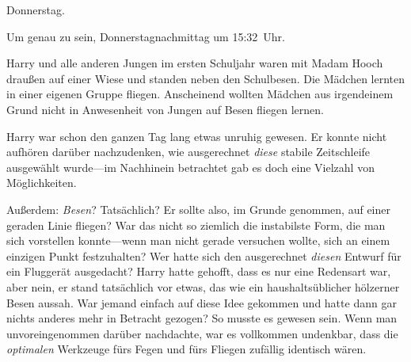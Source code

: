 \later

Donnerstag.

Um genau zu sein, Donnerstagnachmittag um 15:32~Uhr.

Harry und alle anderen Jungen im ersten Schuljahr waren mit Madam Hooch draußen auf einer Wiese und standen neben den Schulbesen. Die Mädchen lernten in einer eigenen Gruppe fliegen. Anscheinend wollten Mädchen aus irgendeinem Grund nicht in Anwesenheit von Jungen auf Besen fliegen lernen.

Harry war schon den ganzen Tag lang etwas unruhig gewesen. Er konnte nicht aufhören darüber nachzudenken, wie ausgerechnet \emph{diese} stabile Zeitschleife ausgewählt wurde—im Nachhinein betrachtet gab es doch eine Vielzahl von Möglichkeiten.

Außerdem: \emph{Besen}? Tatsächlich? Er sollte also, im Grunde genommen, auf einer geraden Linie fliegen? War das nicht so ziemlich die instabilste Form, die man sich vorstellen konnte—wenn man nicht gerade versuchen wollte, sich an einem einzigen Punkt festzuhalten? Wer hatte sich den ausgerechnet \emph{diesen} Entwurf für ein Fluggerät ausgedacht? Harry hatte gehofft, dass es nur eine Redensart war, aber nein, er stand tatsächlich vor etwas, das wie ein haushaltsüblicher hölzerner Besen aussah. War jemand einfach auf diese Idee gekommen und hatte dann gar nichts anderes mehr in Betracht gezogen? So musste es gewesen sein. Wenn man unvoreingenommen darüber nachdachte, war es vollkommen undenkbar, dass die \emph{optimalen} Werkzeuge fürs Fegen und fürs Fliegen zufällig identisch wären.

